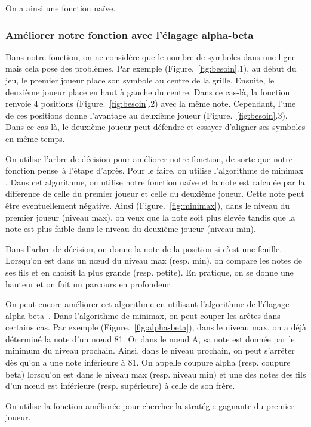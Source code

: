 \documentclass[12pt, a4paper]{article}
\begin{document}
On a ainsi une fonction naïve.

\subsubsection{Améliorer notre fonction avec l'élagage alpha-beta}
Dans notre fonction, on ne considère que le nombre de symboles dans une ligne mais cela pose des problèmes. Par exemple (\mbox{Figure. \ref{fig:besoin}.1}), au début du jeu, le premier joueur place son symbole au centre de la grille. Ensuite, le deuxième joueur place en haut à gauche du centre. Dans ce cas-là, la fonction renvoie 4 positions (\mbox{Figure. \ref{fig:besoin}.2}) avec la même note. Cependant, l'une de ces positions donne l'avantage au deuxième joueur (\mbox{Figure. \ref{fig:besoin}.3}). Dans ce cas-là, le deuxième joueur peut défendre et essayer d'aligner ses symboles en même temps. 
\par
On utilise l'arbre de décision pour améliorer notre fonction, de sorte que notre fonction \og pense\fg \ à l'étape d'après. Pour le faire, on utilise l'algorithme de minimax \cite{minimax}. Dans cet algorithme, on utilise notre fonction naïve et la note est calculée par la difference de celle du premier joueur et celle du deuxième joueur. Cette note peut être eventuellement négative. Ainsi (\mbox{Figure. \ref{fig:minimax}}), dans le niveau du premier joueur (niveau max), on veux que la note soit plus élevée tandis que la note est plus faible dans le niveau du deuxième joueur (niveau min).

Dans l'arbre de décision, on donne la note de la position si c'est une feuille. Lorsqu'on est dans un nœud du niveau max (resp. min), on compare les notes de ses fils et en choisit la plus grande (resp. petite). En pratique, on se donne une hauteur et on fait un parcours en profondeur.\par
On peut encore améliorer cet algorithme en utilisant l'algorithme de l'élagage \mbox{alpha-beta \cite{alpha-beta}}. Dans l'algorithme de minimax, on peut couper les arêtes dans certains cas. Par exemple (\mbox{Figure. \ref{fig:alpha-beta}}), dans le niveau max, on a déjà déterminé la note d'un nœud 81. Or dans le nœud A, sa note est donnée par le minimum du niveau prochain. Ainsi, dans le niveau prochain, on peut s'arrêter dès qu'on a une note inférieure à 81. On appelle coupure alpha (resp. coupure beta) lorsqu'on est dans le niveau max (resp. niveau min) et une des notes des fils d'un nœud est inférieure (resp. supérieure) à celle de son frère.\par
On utilise la fonction améliorée pour chercher la stratégie gagnante du premier joueur.
\end{document}
